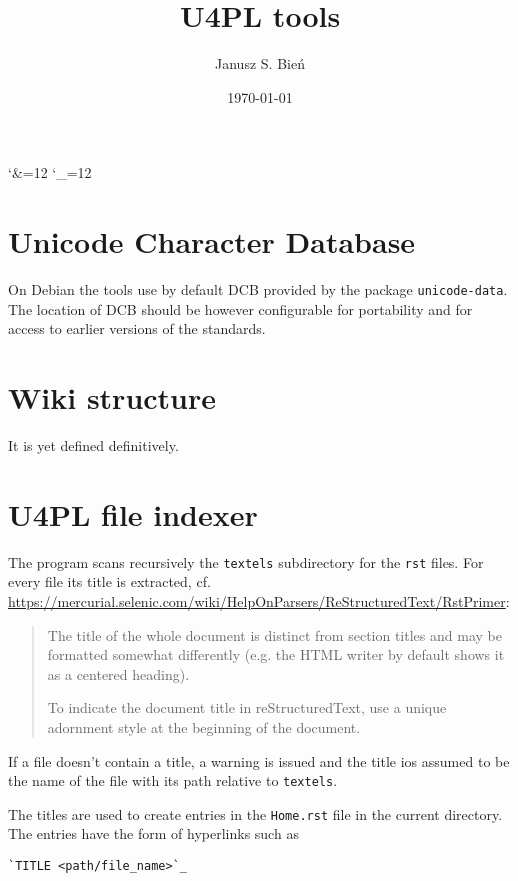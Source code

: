 \documentclass[12]{mwart}
\title{U4PL tools}
\author{Janusz S. Bień}
\date{\today}
\begin{document}
\maketitle

\catcode`\&=12
\catcode`\_=12

\section{Unicode Character Database}
\label{sec:unic-char-datab}

On Debian the tools use by default DCB provided by the package
\texttt{unicode-data}. The location of DCB should be however
configurable for portability and for access to earlier versions of the
standards.

\section{Wiki structure}
\label{sec:wiki-structure}

It is yet defined definitively.

\section{U4PL file indexer}
\label{sec:u4pl-file-indexer}

The program scans recursively the \texttt{textels} subdirectory for the
\texttt{rst} files. For every file its title is extracted,
cf. \url{https://mercurial.selenic.com/wiki/HelpOnParsers/ReStructuredText/RstPrimer}:
\begin{quote}
  The title of the whole document is distinct from section titles and
  may be formatted somewhat differently (e.g. the HTML writer by
  default shows it as a centered heading).

  To indicate the document title in reStructuredText, use a unique
  adornment style at the beginning of the document.
\end{quote}
If a file doesn't contain a title, a warning is issued and the title
ios assumed to be the name of the file with its path relative to
\texttt{textels}.


The titles are used to create entries in the \texttt{Home.rst} file in
the current directory. The entries have the form of hyperlinks such as

{
\begin{verbatim}
`TITLE <path/file_name>`_
\end{verbatim}
}
\end{document}
